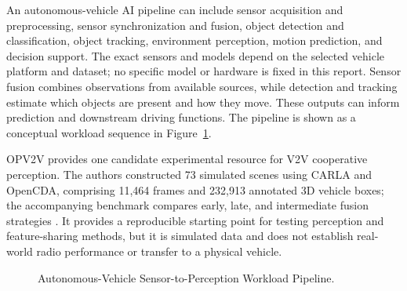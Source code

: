\documentclass[12pt,a4paper,oneside]{report}
\begin{document}
An autonomous-vehicle AI pipeline can include sensor acquisition and
preprocessing, sensor synchronization and fusion, object detection and
classification, object tracking, environment perception, motion prediction,
and decision support. The exact sensors and models depend on the selected
vehicle platform and dataset; no specific model or hardware is fixed in
this report. Sensor fusion combines observations from available sources,
while detection and tracking estimate which objects are present and how
they move. These outputs can inform prediction and downstream driving
functions. The pipeline is shown as a conceptual workload sequence in
Figure~\ref{fig:autonomous-vehicle-ai-pipeline}.

OPV2V provides one candidate experimental resource for V2V cooperative
perception. The authors constructed 73 simulated scenes using CARLA and
OpenCDA, comprising 11,464 frames and 232,913 annotated 3D vehicle boxes;
the accompanying benchmark compares early, late, and intermediate fusion
strategies \cite{opv2v2022}. It provides a reproducible starting point for
testing perception and feature-sharing methods, but it is simulated data
and does not establish real-world radio performance or transfer to a
physical vehicle.

\begin{figure}[H]
  \centering
  \caption{Autonomous-Vehicle Sensor-to-Perception Workload Pipeline.}
  \label{fig:autonomous-vehicle-ai-pipeline}
\end{figure}
\end{document}
